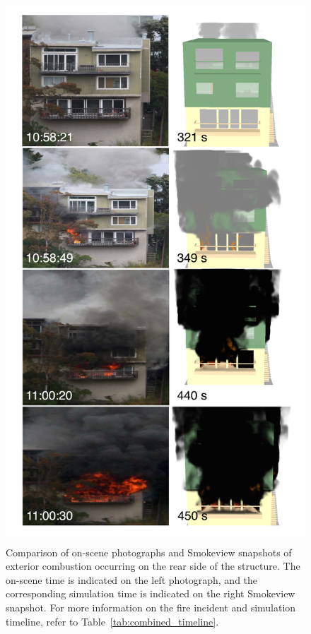 \documentclass[12pt,oneside]{book}
\begin{document}
\begin{figure}[!ht]
\includegraphics[height=8.0in]{../Figures/Timeline_Comparison}
\caption{Comparison of on-scene photographs and Smokeview snapshots of exterior combustion occurring on the rear side of the structure. The on-scene time is indicated on the left photograph, and the corresponding simulation time is indicated on the right Smokeview snapshot. For more information on the fire incident and simulation timeline, refer to Table~\ref{tab:combined_timeline}.}
\label{fig:timeline_comparison_rear}
\end{figure}
\end{document}

